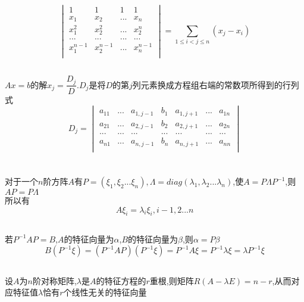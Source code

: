\documentclass[11pt, a4paper, UTF8]{ctexart}
\begin{document}
\subsection{}
\[
\begin{vmatrix}
1&1&1&1\\
x_1&x_2&...&x_n\\
x_1^2&x_2^2&...&x_2^n\\
...&...&...&...\\
x_1^{n-1}&x_2^{n-1}&...&x_n^{n-1}\\
\end{vmatrix}=\sum_{1\le i<j\le n}(x_j-x_i)
\]
\subsection{}
$Ax=b$的解$x_j=\dfrac{D_j}{D}.D_j$是将$D$的第$j$列元素换成方程组右端的常数项所得到的行列式
\[D_j=\begin{vmatrix}
a_{11}&...&a_{1,j-1}&b_1&a_{1,j+1}&...&a_{1n}\\
a_{21}&...&a_{2,j-1}&b_2&a_{2,j+1}&...&a_{2n}\\
...&...&...&...&...&...&...\\
a_{n1}&...&a_{n,j-1}&b_n&a_{n,j+1}&...&a_{nn}\\
\end{vmatrix}\]
\section{}
\subsection{}
对于一个$n$阶方阵$A$有$P=(\xi_1,\xi_2...\xi_n),\varLambda=diag(\lambda_1,\lambda_2...\lambda_n)$,使$A=P\varLambda P^{-1}$,则$AP=P\varLambda$\\
所以有
\[A\xi_i=\lambda_i\xi_i,i-1,2...n\]
\subsection{}
若$P^{-1}AP=B$,$A$的特征向量为$\alpha$,$B$的特征向量为$\beta$,则$\alpha=P\beta$\\
\[B(P^{-1}\xi)=(P^{-1}AP)(P^{-1}\xi)=P^{-1}A\xi=P^{-1}\lambda\xi=\lambda P^{-1}\xi\]
\subsection{}
设$A$为$n$阶对称矩阵,$\lambda$是$A$的特征方程的$r$重根,则矩阵$R(A-\lambda E)=n-r$,从而对应特征值$\lambda$恰有$r$个线性无关的特征向量
\end{document}
